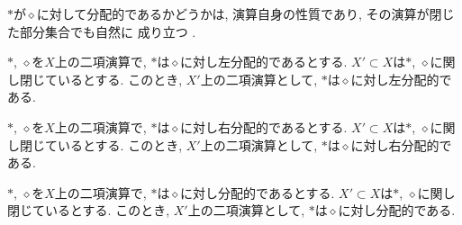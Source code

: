 $\ast$が$\diamond$に対して分配的であるかどうかは,
演算自身の性質であり,
その演算が閉じた部分集合でも自然に
成り立つ .
\begin{prop}
  $\ast$, $\diamond$を$X$上の二項演算で,
  $\ast$は$\diamond$に対し左分配的であるとする.
  $X'\subset X$は$\ast$, $\diamond$に関し閉じているとする.
  このとき,
  $X'$上の二項演算として,
  $\ast$は$\diamond$に対し左分配的である.
\end{prop}
\begin{prop}
  $\ast$, $\diamond$を$X$上の二項演算で,
  $\ast$は$\diamond$に対し右分配的であるとする.
  $X'\subset X$は$\ast$, $\diamond$に関し閉じているとする.
  このとき,
  $X'$上の二項演算として,
  $\ast$は$\diamond$に対し右分配的である.
\end{prop}
\begin{prop}
  $\ast$, $\diamond$を$X$上の二項演算で,
  $\ast$は$\diamond$に対し分配的であるとする.
  $X'\subset X$は$\ast$, $\diamond$に関し閉じているとする.
  このとき,
  $X'$上の二項演算として,
  $\ast$は$\diamond$に対し分配的である.
\end{prop}

